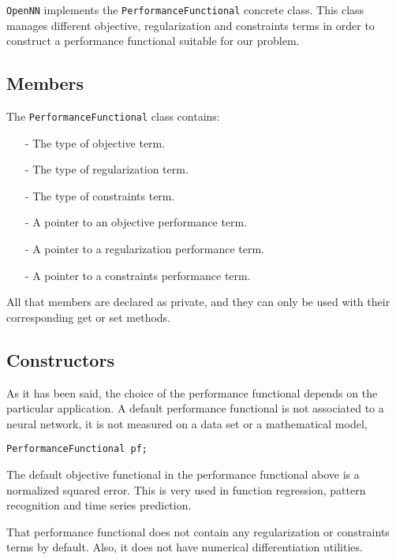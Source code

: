 
\texttt{OpenNN} implements the \lstinline"PerformanceFunctional" concrete class. 
This class manages different objective, regularization and constraints terms in order to construct a 
performance functional suitable for our problem. 

\subsection*{Members}

The \lstinline"PerformanceFunctional" class contains:

\begin{itemize}
\item[-] The type of objective term.
\item[-] The type of regularization term.
\item[-] The type of constraints term.
\item[-] A pointer to an objective performance term.
\item[-] A pointer to a regularization performance term.
\item[-] A pointer to a constraints performance term.
\end{itemize}

All that members are declared as private, and they can only be used with their corresponding get or set methods. 

\subsection*{Constructors}

As it has been said, the choice of the performance functional depends on the particular application. 
A default performance functional is not associated to a neural network, it is not measured on a data set or a mathematical model,

\begin{lstlisting}
PerformanceFunctional pf;
\end{lstlisting}

The default objective functional in the performance functional above is a normalized squared error. 
This is very used in function regression, pattern recognition and time series prediction. 

That performance functional does not contain any regularization or constraints terms by default. Also, it does not have  numerical differentiation utilities. 

